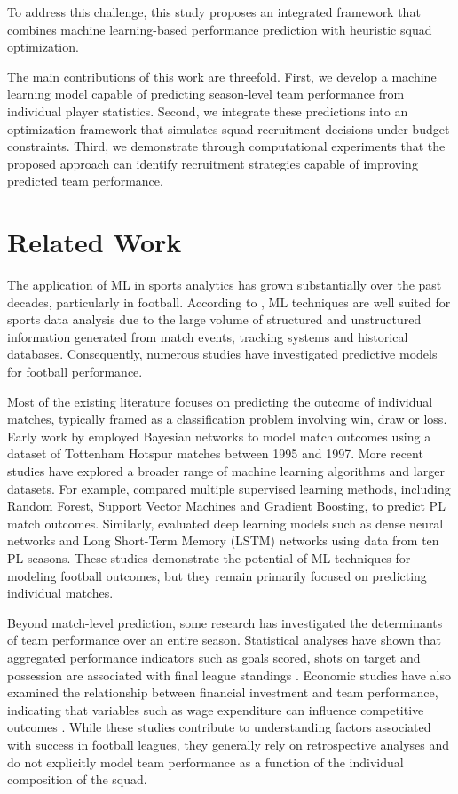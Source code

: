 \documentclass[a4paper,fleqn]{cas-sc}
\begin{document}
To address this challenge, this study proposes an integrated framework that combines machine learning-based performance prediction with heuristic squad optimization.

The main contributions of this work are threefold. First, we develop a machine learning model capable of predicting season-level team performance 
from individual player statistics. Second, we integrate these predictions into an optimization framework that simulates squad recruitment decisions under 
budget constraints. Third, we demonstrate through computational experiments that the proposed approach can identify recruitment strategies capable of improving 
predicted team performance.

\section{Related Work}

The application of ML in sports analytics has grown substantially over the past decades, particularly in football. 
According to \cite{Horvat2020}, ML techniques are well suited for sports data analysis due to the large volume of structured and unstructured information 
generated from match events, tracking systems and historical databases. Consequently, numerous studies have investigated predictive models for football performance.

Most of the existing literature focuses on predicting the outcome of individual matches, typically framed as a classification problem involving win, 
draw or loss. Early work by \cite{Joseph2006} employed Bayesian networks to model match outcomes using a dataset of Tottenham Hotspur matches between 1995 and 1997. 
More recent studies have explored a broader range of machine learning algorithms and larger datasets. For example, \cite{Baboota2019} compared multiple 
supervised learning methods, including Random Forest, Support Vector Machines and Gradient Boosting, to predict PL match outcomes. 
Similarly, \cite{Awadallah2020} evaluated deep learning models such as dense neural networks and Long Short-Term Memory (LSTM) networks using data from ten PL seasons. 
These studies demonstrate the potential of ML techniques for modeling football outcomes, but they remain primarily focused on predicting individual matches.

Beyond match-level prediction, some research has investigated the determinants of team performance over an entire season. 
Statistical analyses have shown that aggregated performance indicators such as goals scored, shots on target and possession are associated with 
final league standings \cite{LagoBallesteros2010}. Economic studies have also examined the relationship between financial investment and team performance, 
indicating that variables such as wage expenditure can influence competitive outcomes \cite{Carmichael2011}. While these studies contribute to 
understanding factors associated with success in football leagues, they generally rely on retrospective analyses and do not explicitly model team 
performance as a function of the individual composition of the squad.
\end{document}
